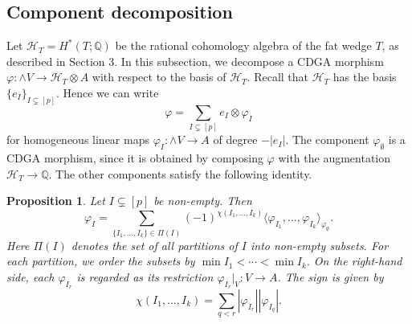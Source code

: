 \documentclass[a4paper,10pt]{amsart}
\newtheorem{prop}[thm]{Proposition}
\theoremstyle{definition}
\theoremstyle{remark}
\numberwithin{equation}{section}
\begin{document}
\subsection{Component decomposition}

Let $\mathcal H_T=H^*(T;\mathbb{Q})$ be the rational cohomology algebra of the
fat wedge $T$, as described in Section 3.
In this subsection, we
decompose a CDGA morphism
$
\varphi:\wedge V\to \mathcal H_T\otimes A
$
with respect to the basis of $\mathcal H_T$.
Recall that $\mathcal H_T$ has the basis
$\{e_I\}_{I\subsetneq [p]}$.
Hence we can write
\[
        \varphi=\sum_{I\subsetneq [p]} e_I\otimes \varphi_I
\]
for homogeneous linear maps $\varphi_I:\wedge V\to A$ of degree $-|e_I|$.
The component $\varphi_{\emptyset}$ is a CDGA morphism, since it is obtained
by composing $\varphi$ with the augmentation
$
\mathcal H_T\to \mathbb Q.
$
The other components satisfy the following identity.

\begin{prop}\label{prop:component-decomposition}
Let $I\subsetneq [p]$ be non-empty. Then
\[
\varphi_I
=
\sum_{\{I_1,\ldots,I_k\}\in \Pi(I)}
(-1)^{\chi(I_1,\ldots,I_k)}
\langle \varphi_{I_1},\ldots,\varphi_{I_k}\rangle_{\varphi_{\emptyset}}.
\]
Here $\Pi(I)$ denotes the set of all partitions of $I$ into non-empty subsets.
For each partition, we order the subsets by
$
\min I_1<\cdots<\min I_k.
$
On the right-hand side, each $\varphi_{I_r}$ is regarded as its restriction
$\varphi_{I_r}|_V:V\to A$. 
The sign is given by
\[
        \chi(I_1,\ldots,I_k)
        =
        \sum_{q<r}|\varphi_{I_r}||\varphi_{I_q}|.
\]
\end{prop}
\end{document}
